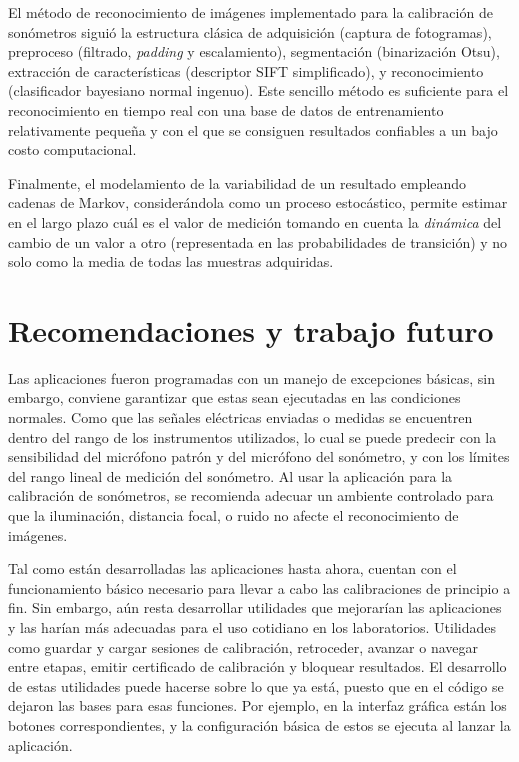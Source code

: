 El método de reconocimiento de imágenes implementado para la calibración de sonómetros siguió la estructura clásica de
adquisición (captura de fotogramas), preproceso (filtrado, \emph{padding} y escalamiento), segmentación
(binarización Otsu), extracción de características (descriptor SIFT simplificado), y reconocimiento (clasificador
bayesiano normal ingenuo).
Este sencillo método es suficiente para el reconocimiento en tiempo real con una base de datos
de entrenamiento relativamente pequeña y con el que se consiguen resultados confiables a un bajo costo computacional.

Finalmente, el modelamiento de la variabilidad de un resultado empleando cadenas de Markov, considerándola como un proceso
estocástico, permite estimar en el largo plazo cuál es el valor de medición tomando en cuenta la \emph{dinámica} del
cambio de un valor a otro (representada en las probabilidades de transición) y no solo como la media de todas las
muestras adquiridas.

\section{Recomendaciones y trabajo futuro}
Las aplicaciones fueron programadas con un manejo de excepciones básicas, sin embargo, conviene garantizar que estas
sean ejecutadas en las condiciones normales.
Como que las señales eléctricas enviadas o medidas se encuentren dentro del rango de los instrumentos utilizados,
lo cual se puede predecir con la sensibilidad del micrófono patrón y del micrófono del sonómetro, y con los límites
del rango lineal de medición del sonómetro.
Al usar la aplicación para la calibración de sonómetros, se recomienda adecuar un ambiente controlado para que la
iluminación, distancia focal, o ruido no afecte el reconocimiento de imágenes.

Tal como están desarrolladas las aplicaciones hasta ahora, cuentan con el funcionamiento básico necesario para llevar a
cabo las calibraciones de principio a fin.
Sin embargo, aún resta desarrollar utilidades que mejorarían las aplicaciones y las harían más adecuadas para el uso
cotidiano en los laboratorios.
Utilidades como guardar y cargar sesiones de calibración, retroceder, avanzar o navegar entre etapas, emitir certificado
de calibración y bloquear resultados.
El desarrollo de estas utilidades puede hacerse sobre lo que ya está, puesto que en el código se dejaron las bases para
esas funciones.
Por ejemplo, en la interfaz gráfica están los botones correspondientes, y la configuración básica de estos se ejecuta al
lanzar la aplicación.

